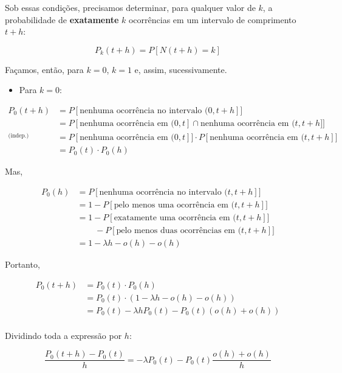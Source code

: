 \documentclass[
]{book}
\providecommand{\tightlist}{%
  \setlength{\itemsep}{0pt}\setlength{\parskip}{0pt}}
\theoremstyle{definition}
\theoremstyle{definition}
\theoremstyle{definition}
\theoremstyle{remark}
\begin{document}
Sob essas condições, precisamos determinar, para qualquer valor de \(k\), a probabilidade de \textbf{exatamente} \(k\) ocorrências em um intervalo de comprimento \(t+h\):

\[P_k(t+h) = P[N(t+h) = k]\]

Façamos, então, para \(k=0\), \(k=1\) e, assim, sucessivamente.

\begin{itemize}
\tightlist
\item
  Para \(k = 0\):
\end{itemize}

\begin{align*}
  P_0(t+h) &= P[\text{nenhuma ocorrência no intervalo } (0, t+h]]\\
           &= P[\text{nenhuma ocorrência em } (0, t] \cap 
                \text{nenhuma ocorrência em } (t, t+h] ]\\
  \stackrel{\text{(indep.)}}{} 
           &= P[\text{nenhuma ocorrência em } (0, t]] \cdot  
              P[\text{nenhuma ocorrência em }(t, t+h]]\\  
           &= P_0(t) \cdot P_0(h)
\end{align*}

Mas,

\begin{align*}
  P_0(h)  &= P[\text{nenhuma ocorrência no intervalo } (t, t+h]]\\
          &= 1 - P [\text{pelo menos uma ocorrência em }(t, t+h]]\\
          &= 1 - P[\text{exatamente uma ocorrência em } (t, t+h]] \\
          & \phantom{= 1\;}- P[\text{pelo menos duas ocorrências em }(t, t+h]]\\
          &= 1 - \lambda h - o(h) - o(h)
\end{align*}

Portanto,

\begin{align*}
  P_0(t+h) &= P_0(t) \cdot P_0(h)  \\
           &= P_0(t) \cdot (1 - \lambda h - o(h) - o(h))\\
           &= P_0(t) - \lambda h P_0(t) - P_0(t) (o(h) + o(h))\\
\end{align*}

Dividindo toda a expressão por \(h\):

\[\frac{P_0(t+h) - P_0(t)}{h} = - \lambda P_0(t) - P_0(t) \frac{o(h) + o(h)}{h}\]
\end{document}
